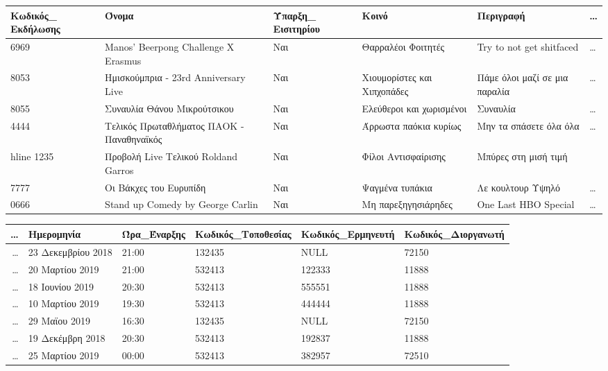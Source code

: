\begin{table}[H]
  \centering
  \footnotesize
  \begin{tabular}{|p{1.6cm}|p{2.8cm}|p{1.5cm}|l|l|l}
  \hline
  Κωδικός\_ Εκδήλωσης & Όνομα                               
    & Ύπαρξη\_ Εισιτηρίου & Κοινό              & Περιγραφή & \ldots \\ \hline
  6969               & Manos' Beerpong Challenge X Erasmus 
    & Ναι                & Θαρραλέοι Φοιτητές & Try to not get
                                                shitfaced & \ldots  \\ \hline
  8053               & Ημισκούμπρια - 23rd Anniversary Live
    & Ναι            & Χιουμορίστες και Χιπχοπάδες & Πάμε όλοι μαζί σε μια παραλία & \ldots  \\ \hline
  8055               & Συναυλία Θάνου Μικρούτσικου & Ναι
    & Ελεύθεροι και χωρισμένοι & Συναυλία & \ldots  \\ \hline
  4444               & Τελικός Πρωταθλήματος ΠΑΟΚ - Παναθηναϊκός
    & Ναι            & Άρρωστα παόκια κυρίως & Μην τα σπάσετε όλα όλα & \ldots \\hline
  1235               & Προβολή Live Τελικού Roldand Garros 
    & Ναι            & Φίλοι Αντισφαίρισης & Μπύρες στη μισή τιμή   \\ \hline
  7777               & Οι Βάκχες του Ευρυπίδη & Ναι
    & Ψαγμένα τυπάκια & Λε κουλτουρ Υψηλό & \ldots \\ \hline
  0666               & Stand up Comedy by George Carlin
    & Ναι            & Μη παρεξηγησιάρηδες & One Last HBO Special & \ldots \\ \hline
  \end{tabular}
   \begin{tabular}{r|l|l|l|l|l|}
  \hline
  \ldots & Ημερομηνία         & Ώρα\_Έναρξης & Κωδικός\_Τοποθεσίας & Κωδικός\_Ερμηνευτή & Κωδικός\_Διοργανωτή \\ \hline
  \ldots & 23 Δεκεμβρίου 2018 & 21:00        & 132435              & NULL               & 72150               \\ \hline
  \ldots & 20 Μαρτίου 2019    & 21:00        & 532413              & 122333             & 11888               \\ \hline
  \ldots & 18 Ιουνίου 2019    & 20:30        & 532413              & 555551             & 11888               \\ \hline
  \ldots & 10 Μαρτίου 2019    & 19:30        & 532413              & 444444             & 11888               \\ \hline
  \ldots & 29 Μαϊου 2019      & 16:30        & 132435              & NULL               & 72150               \\ \hline
  \ldots & 19 Δεκέμβρη 2018   & 20:30        & 532413              & 192837             & 11888               \\ \hline
  \ldots & 25 Μαρτίου 2019    & 00:00        & 532413              & 382957             & 72510               \\ \hline
\end{tabular}
\end{table}
  
